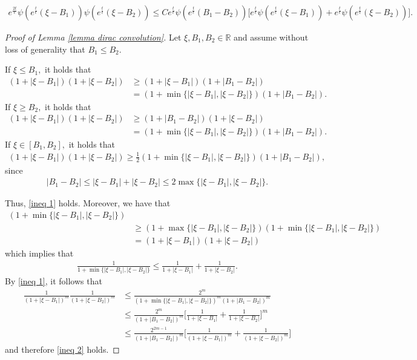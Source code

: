 \documentclass[11pt]{article}
\numberwithin{equation}{section}
\begin{document}
\begin{align*}
e^{\frac{2t}{\epsilon}}\psi(e^{\frac{t}{\epsilon}}(\xi-B_{1}))\psi(e^{\frac{t}{\epsilon}}(\xi-B_{2}))\leq C e^{\frac{t}{\epsilon}}\psi(e^{\frac{t}{\epsilon}}(B_{1}-B_{2}))\bigg[e^{\frac{t}{\epsilon}}\psi(e^{\frac{t}{\epsilon}}(\xi-B_{1}))+e^{\frac{t}{\epsilon}}\psi(e^{\frac{t}{\epsilon}}(\xi-B_{2}))\bigg].
\end{align*}
\begin{proof}[Proof of Lemma \ref{lemma dirac convolution}]
    Let $\xi, B_{1},B_{2}  \in\mathbb{R}$ and assume without loss of generality that $B_{1}\leq B_{2}$. 
 
 If $\xi\leq B_{1},$ it holds that
    \begin{align*}
        (1+|\xi-B_{1}|)(1+|\xi-B_{2}|)&\geq (1+|\xi-B_{1}|)(1+|B_{1}-B_{2}|)\\
        &= (1+\min\{|\xi-B_{1}|,|\xi-B_{2}|\})(1+|B_{1}-B_{2}|).
    \end{align*}
    If $\xi\geq B_{2},$ it holds that
    \begin{align*}
        (1+|\xi-B_{1}|)(1+|\xi-B_{2}|)&\geq (1+|B_{1}-B_{2}|)(1+|\xi-B_{2}|)\\
        &= (1+\min\{|\xi-B_{1}|,|\xi-B_{2}|\})(1+|B_{1}-B_{2}|).
    \end{align*}
        If $\xi\in[B_{1},B_{2}],$ it holds that
        \begin{align*}
               (1+|\xi-B_{1}|)(1+|\xi-B_{2}|)\geq \frac{1}{2}(1+\min\{|\xi-B_{1}|,|\xi-B_{2}|\})(1+|B_{1}-B_{2}|),
        \end{align*}
        since
        \begin{align*}
            |B_{1}-B_{2}|\leq |\xi-B_{1}|+|\xi-B_{2}|\leq 2\max\{|\xi-B_{1}|,|\xi-B_{2}|\}.
        \end{align*}

        Thus, \eqref{ineq 1} holds. Moreover, we have that
        \begin{align*}
               [(1+|\xi-B_{1}|)&+(1+|\xi-B_{2}|)](1+\min\{|\xi-B_{1}|,|\xi-B_{2}|\})\\
               &\geq(1+\max\{|\xi-B_{1}|,|\xi-B_{2}|\})(1+\min\{|\xi-B_{1}|,|\xi-B_{2}|\})\\
               &=(1+|\xi-B_{1}|)(1+|\xi-B_{2}|)
        \end{align*}
     which implies that
        \begin{align*}
           \frac{1}{1+\min\{|\xi-B_{1}|,|\xi-B_{2}|\}}\leq \frac{1}{1+|\xi-B_{1}|}+\frac{1}{1+|\xi-B_{2}|}.
        \end{align*}
By \eqref{ineq 1}, it follows that
\begin{align*}
      \frac{1}{(1+|\xi-B_{1}|)^{m}}  \frac{1}{(1+|\xi-B_{2}|)^{m}}&\leq \frac{2^{m}}{(1+\min\{|\xi-B_{1}|,|\xi-B_{2}|\})^{m}(1+|B_{1}-B_{2}|)^{m}}\\
      &\leq \frac{2^{m}}{(1+|B_{1}-B_{2}|)^{m}}\bigg[\frac{1}{1+|\xi-B_{1}|}+\frac{1}{1+|\xi-B_{2}|}\bigg]^{m}\\
        &\leq \frac{2^{2m-1}}{(1+|B_{1}-B_{2}|)^{m}}\bigg[\frac{1}{(1+|\xi-B_{1}|)^{m}}+\frac{1}{(1+|\xi-B_{2}|)^{m}}\bigg]
\end{align*}
and therefore \eqref{ineq 2} holds.
\end{proof}
\end{document}
